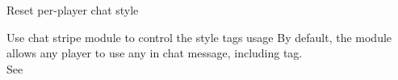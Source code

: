 \begin{example}{Reset per-player chat style}
\end{example}

\begin{example}{Use chat stripe module to control the style tags usage}
    By default, the  module allows any player to use any  in chat message, including  tag.\\
    See~
\end{example}
